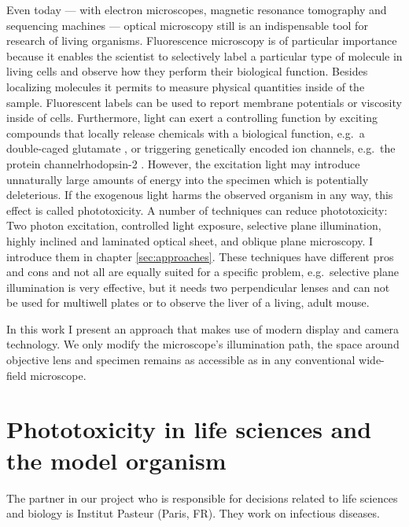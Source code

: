 Even today --- with electron microscopes, magnetic resonance
tomography and sequencing machines --- optical microscopy still is an
indispensable tool for research of living organisms.  Fluorescence
microscopy is of particular importance because it enables the
 scientist to selectively label a particular
type of molecule in living cells and observe how they perform their
biological function.  Besides localizing molecules it permits to
measure physical quantities inside of the sample. Fluorescent labels
can be used to report membrane potentials or viscosity inside of
cells.  Furthermore, light can exert a controlling function by
exciting compounds that locally release chemicals with a biological
function, e.g.\ a double-caged glutamate \citep{Pettit1997}, or
triggering genetically encoded ion channels, e.g.\ the protein
channelrhodopsin-2 \citep{Boyden2005}. However, the excitation light
may introduce unnaturally large amounts of energy into the specimen
which is potentially deleterious. If the exogenous light harms the
observed organism in any way, this effect is called phototoxicity.
A number of techniques can reduce phototoxicity: Two photon
excitation, controlled light exposure, selective plane illumination,
highly inclined and laminated optical sheet, and oblique plane
microscopy. I introduce them in chapter \ref{sec:approaches}. These
techniques have different pros and cons and not all are equally suited
for a specific problem, e.g.\ selective plane illumination is very
effective, but it needs two perpendicular lenses and can not be used
for multiwell plates or to observe the liver of a living, adult mouse.

In this work I present an approach that makes use of modern display
and camera technology. We only modify the microscope's illumination
path, the space around objective lens and specimen remains as
accessible as in any conventional wide-field microscope.



\section{Phototoxicity in life sciences and the model organism
  \celegans}
\label{sec:intro-phototoxicity}
The partner in our project who is responsible for decisions related to
life sciences and biology is Institut Pasteur (Paris, FR). They work
on infectious diseases. 

